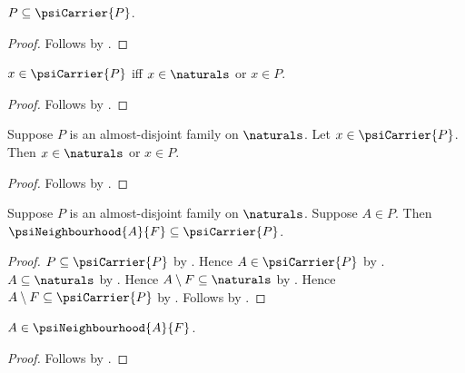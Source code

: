 \begin{proposition}\label{psi_family_subset_psi_carrier}
    $P\subseteq\psiCarrier{P}$.
\end{proposition}
\begin{proof}
    Follows by .
\end{proof}

\begin{proposition}\label{psi_carrier_iff}
    $x\in\psiCarrier{P}$ iff
        $x\in\naturals$ or $x\in P$.
\end{proposition}
\begin{proof}
    Follows by .
\end{proof}

\begin{proposition}\label{psi_carrier_point_cases}
    Suppose $P$ is an almost-disjoint family on
        $\naturals$.
    Let $x\in\psiCarrier{P}$.
    Then $x\in\naturals$ or $x\in P$.
\end{proposition}
\begin{proof}
    Follows by .
\end{proof}

\begin{proposition}\label{psi_neighbourhood_subset_carrier}
    Suppose $P$ is an almost-disjoint family on
        $\naturals$.
    Suppose $A\in P$.
    Then $\psiNeighbourhood{A}{F}\subseteq\psiCarrier{P}$.
\end{proposition}
\begin{proof}
    $P\subseteq\psiCarrier{P}$ by .
    Hence $A\in\psiCarrier{P}$ by .
    $A\subseteq\naturals$
        by .
    Hence $A\setminus F\subseteq\naturals$
        by .
    Hence $A\setminus F\subseteq\psiCarrier{P}$
        by .
    Follows by
        .
\end{proof}

\begin{proposition}\label{psi_neighbourhood_contains_center}
    $A\in\psiNeighbourhood{A}{F}$.
\end{proposition}
\begin{proof}
    Follows by
        .
\end{proof}

